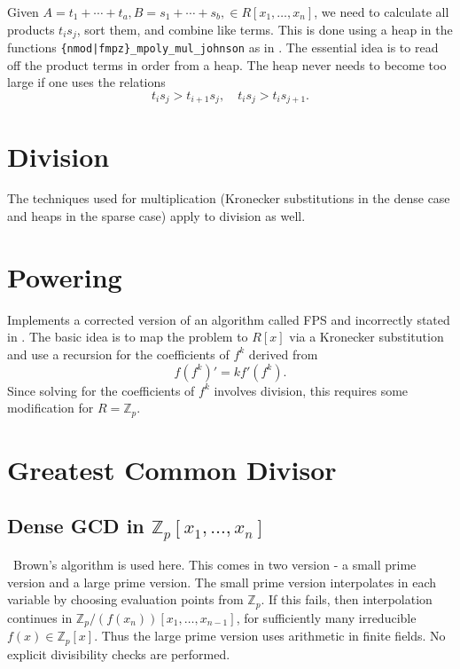 \documentclass[12pt,reqno]{amsart}
\numberwithin{equation}{section}
\newcommand{\bbZ}[0]  { \mathbb{Z}}
\begin{document}
Given $A = t_1 + \cdots + t_a, B = s_1 + \cdots + s_b, \in R[x_1,\dots,x_n]$, we need to calculate all products $t_i s_j$, sort them, and combine like terms. This is done using a heap in the functions {\tt \{nmod|fmpz\}\_mpoly\_mul\_johnson} as in \cite{Johnson}. The essential idea is to read off the product terms in order from a heap. The heap never needs to become too large if one uses the relations
\begin{equation*}
t_i s_j > t_{i+1} s_j, \quad t_i s_j > t_i s_{j+1}\text{.}
\end{equation*}


\section{Division}

The techniques used for multiplication (Kronecker substitutions in the dense case and heaps in the sparse case) apply to division as well.


\section{Powering}

Implements a corrected version of an algorithm called FPS and incorrectly stated in \cite{FPS}. The basic idea is to map the problem to $R[x]$ via a Kronecker substitution and use a recursion for the coefficients of $f^k$ derived from
\begin{equation*}
f (f^k)' = k f' (f^k)\text{.}
\end{equation*}
Since solving for the coefficients of $f^k$ involves division, this requires some modification for $R=\bbZ_p$.

\section{Greatest Common Divisor}

\subsection{Dense GCD in $\bbZ_p[x_1,\dots,x_n]$}\
Brown's algorithm \cite{Brown} is used here. This comes in two version - a small prime version and a large prime version. The small prime version interpolates in each variable by choosing evaluation points from $\bbZ_p$. If this fails, then interpolation continues in $\bbZ_p/(f(x_n))[x_1,\dots,x_{n-1}]$, for sufficiently many irreducible $f(x) \in \bbZ_p[x]$. Thus the large prime version uses arithmetic in finite fields. No explicit divisibility checks are performed.
\end{document}
